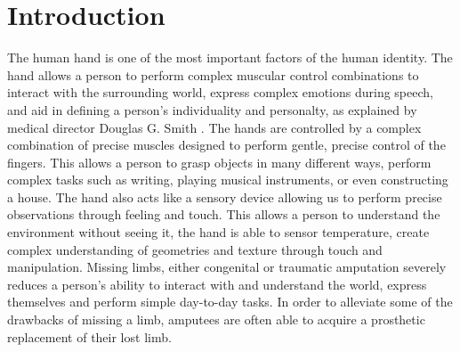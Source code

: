 \documentclass[../main.tex]{subfiles}
\begin{document}
\section{Introduction}

The human hand is one of the most important factors of the human identity.
The hand allows a person to perform complex muscular control combinations to interact with the surrounding world, express complex emotions during speech, and aid in defining a person's individuality and personalty, as explained by medical director Douglas G. Smith \cite{Douglashands}.
The hands are controlled by a complex combination of precise muscles designed to perform gentle, precise control of the fingers.
This allows a person to grasp objects in many different ways, perform complex tasks such as writing, playing musical instruments, or even constructing a house.
The hand also acts like a sensory device allowing us to perform precise observations through feeling and touch.
This allows a person to understand the environment without seeing it, the hand is able to sensor temperature, create complex understanding of geometries and texture through touch and manipulation.
Missing limbs, either \gls{congenital} or \gls{traumatic} amputation severely reduces a person's ability to interact with and understand the world, express themselves and perform simple day-to-day tasks.
In order to alleviate some of the drawbacks of missing a limb, amputees are often able to acquire a prosthetic replacement of their lost limb.
\end{document}
